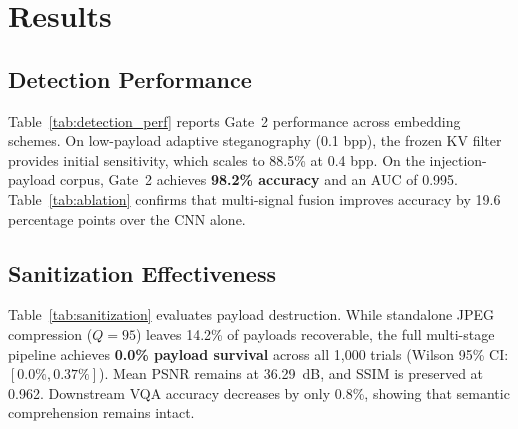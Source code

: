 \documentclass[conference]{IEEEtran}
\begin{document}
\begin{table}[t]
\caption{Gate 2 Ablation (Injection Corpus and 0.2 bpp BOSSbase)}
\label{tab:ablation}
\centering
\vspace{-1.5mm}
\vspace{1.5mm}
\end{table}

\section{Results}
\label{sec:results}

\subsection{Detection Performance}
Table~\ref{tab:detection_perf} reports Gate~2 performance across embedding schemes. On low-payload adaptive steganography (0.1 bpp), the frozen KV filter provides initial sensitivity, which scales to 88.5\% at 0.4 bpp. On the injection-payload corpus, Gate~2 achieves \textbf{98.2\% accuracy} and an AUC of 0.995. Table~\ref{tab:ablation} confirms that multi-signal fusion improves accuracy by 19.6 percentage points over the CNN alone.

\subsection{Sanitization Effectiveness}
Table~\ref{tab:sanitization} evaluates payload destruction. While standalone JPEG compression ($Q=95$) leaves 14.2\% of payloads recoverable, the full multi-stage pipeline achieves \textbf{0.0\% payload survival} across all 1,000 trials (Wilson 95\% CI: $[0.0\%, 0.37\%]$). Mean PSNR remains at 36.29~dB, and SSIM is preserved at 0.962. Downstream VQA accuracy decreases by only 0.8\%, showing that semantic comprehension remains intact.
\end{document}
